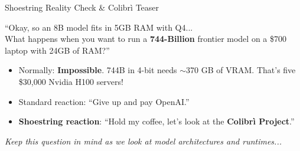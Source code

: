 \documentclass[10pt,aspectratio=169]{beamer}
\begin{document}
\begin{frame}{Shoestring Reality Check \& Colibr\`i Teaser}
    \begin{tcolorbox}[colback=ShoePrimary!10, colframe=ShoePrimary, title=\textbf{The Hardware Wall}]
        \large
        ``Okay, so an 8B model fits in 5GB RAM with Q4... \\
        What happens when you want to run a \textbf{744-Billion} frontier model on a \$700 laptop with 24GB of RAM?''
    \end{tcolorbox}
    \vspace{0.4cm}
    \begin{itemize}
        \item Normally: \alert{\textbf{Impossible}}. 744B in 4-bit needs $\sim$370 GB of VRAM. That's five \$30,000 Nvidia H100 servers!
        \item Standard reaction: ``Give up and pay OpenAI.''
        \item \textbf{Shoestring reaction}: ``Hold my coffee, let's look at the \textbf{Colibr\`i Project}.''
    \end{itemize}
    \vspace{0.3cm}
    \centering
    \textit{Keep this question in mind as we look at model architectures and runtimes...}
\end{frame}
\end{document}
